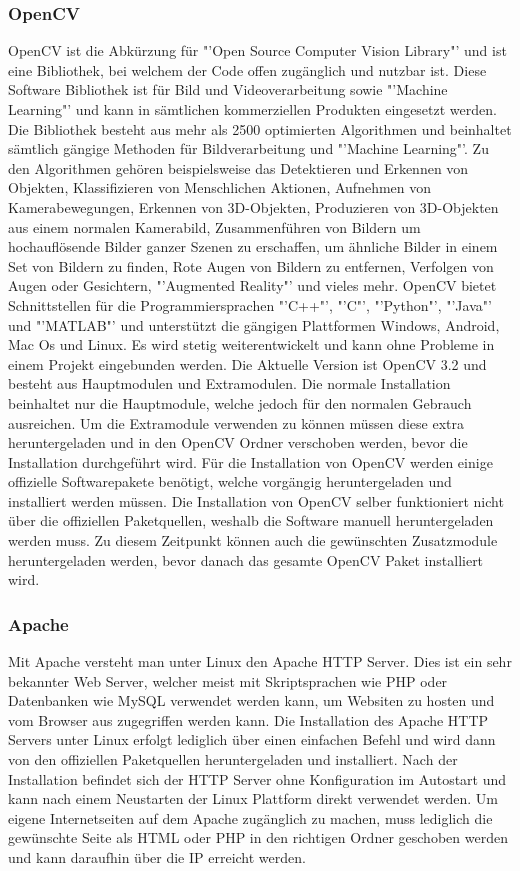 \subsubsection{OpenCV}
OpenCV ist die Abkürzung für "'Open Source Computer Vision Library"' und ist eine Bibliothek, bei welchem der Code offen zugänglich und nutzbar ist. Diese Software Bibliothek ist für Bild und Videoverarbeitung sowie "'Machine Learning"' und kann in sämtlichen kommerziellen Produkten eingesetzt werden. Die Bibliothek besteht aus mehr als 2500 optimierten Algorithmen und beinhaltet sämtlich gängige Methoden für Bildverarbeitung und "'Machine Learning"'. Zu den Algorithmen gehören beispielsweise das Detektieren und Erkennen von Objekten, Klassifizieren von Menschlichen Aktionen, Aufnehmen von Kamerabewegungen, Erkennen von 3D-Objekten, Produzieren von 3D-Objekten aus einem normalen Kamerabild, Zusammenführen von Bildern um hochauflösende Bilder ganzer Szenen zu erschaffen, um ähnliche Bilder in einem Set von Bildern zu finden, Rote Augen von Bildern zu entfernen, Verfolgen von Augen oder Gesichtern, "'Augmented Reality"' und vieles mehr. OpenCV bietet Schnittstellen für die Programmiersprachen "'C++"', "'C"', "'Python"', "'Java"' und "'MATLAB"' und unterstützt die gängigen Plattformen Windows, Android, Mac Os und Linux. Es wird stetig weiterentwickelt und kann ohne Probleme in einem Projekt eingebunden werden. Die Aktuelle Version ist OpenCV 3.2 und besteht aus Hauptmodulen und Extramodulen. Die normale Installation beinhaltet nur die Hauptmodule, welche jedoch für den normalen Gebrauch ausreichen. Um die Extramodule verwenden zu können müssen diese extra heruntergeladen und in den OpenCV Ordner verschoben werden, bevor die Installation durchgeführt wird. Für die Installation von OpenCV werden einige offizielle Softwarepakete benötigt, welche vorgängig heruntergeladen und installiert werden müssen. Die Installation von OpenCV selber funktioniert nicht über die offiziellen Paketquellen, weshalb die Software manuell heruntergeladen werden muss. Zu diesem Zeitpunkt können auch die gewünschten Zusatzmodule heruntergeladen werden, bevor danach das gesamte OpenCV Paket installiert wird. \cite{OpenCV}

\subsubsection{Apache}
Mit Apache versteht man unter Linux den Apache HTTP Server. Dies ist ein sehr bekannter Web Server, welcher meist mit Skriptsprachen wie PHP oder Datenbanken wie MySQL verwendet werden kann, um Websiten zu hosten und vom Browser aus zugegriffen werden kann. Die Installation des Apache HTTP Servers unter Linux erfolgt lediglich über einen einfachen Befehl und wird dann von den offiziellen Paketquellen heruntergeladen und installiert. Nach der Installation befindet sich der HTTP Server ohne Konfiguration im Autostart und kann nach einem Neustarten der Linux Plattform direkt verwendet werden. Um eigene Internetseiten auf dem Apache zugänglich zu machen, muss lediglich die gewünschte Seite als HTML oder PHP in den richtigen Ordner geschoben werden und kann daraufhin über die IP erreicht werden. \cite{Apache}